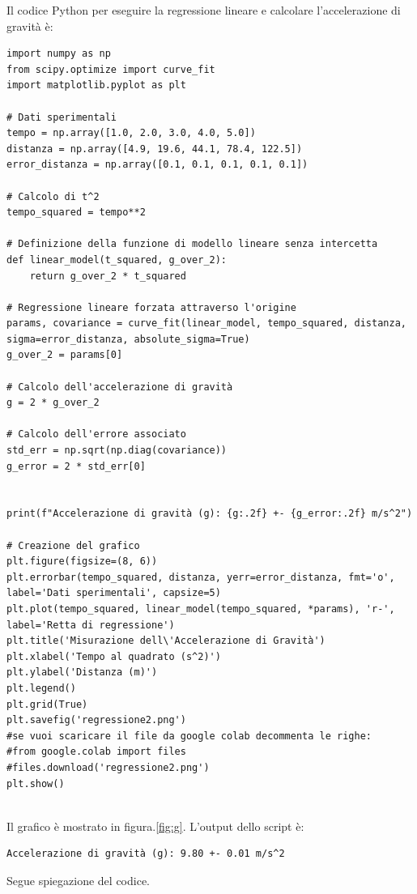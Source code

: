 Il codice Python per eseguire la regressione lineare e calcolare l'accelerazione di gravità è:

\begin{lstlisting}[caption={Calcolo della Regressione Lineare e Accelerazione di Gravità}]
import numpy as np
from scipy.optimize import curve_fit
import matplotlib.pyplot as plt

# Dati sperimentali
tempo = np.array([1.0, 2.0, 3.0, 4.0, 5.0])
distanza = np.array([4.9, 19.6, 44.1, 78.4, 122.5])
error_distanza = np.array([0.1, 0.1, 0.1, 0.1, 0.1])

# Calcolo di t^2
tempo_squared = tempo**2

# Definizione della funzione di modello lineare senza intercetta
def linear_model(t_squared, g_over_2):
    return g_over_2 * t_squared

# Regressione lineare forzata attraverso l'origine
params, covariance = curve_fit(linear_model, tempo_squared, distanza, sigma=error_distanza, absolute_sigma=True)
g_over_2 = params[0]

# Calcolo dell'accelerazione di gravità
g = 2 * g_over_2

# Calcolo dell'errore associato
std_err = np.sqrt(np.diag(covariance))
g_error = 2 * std_err[0]


print(f"Accelerazione di gravità (g): {g:.2f} +- {g_error:.2f} m/s^2")

# Creazione del grafico
plt.figure(figsize=(8, 6))
plt.errorbar(tempo_squared, distanza, yerr=error_distanza, fmt='o', label='Dati sperimentali', capsize=5)
plt.plot(tempo_squared, linear_model(tempo_squared, *params), 'r-', label='Retta di regressione')
plt.title('Misurazione dell\'Accelerazione di Gravità')
plt.xlabel('Tempo al quadrato (s^2)')
plt.ylabel('Distanza (m)')
plt.legend()
plt.grid(True)
plt.savefig('regressione2.png')
#se vuoi scaricare il file da google colab decommenta le righe:
#from google.colab import files
#files.download('regressione2.png')
plt.show()


\end{lstlisting}


Il grafico è mostrato in figura.\ref{fig:g}. L'output dello script è:
\begin{verbatim}
Accelerazione di gravità (g): 9.80 +- 0.01 m/s^2
\end{verbatim}

Segue spiegazione del codice.




